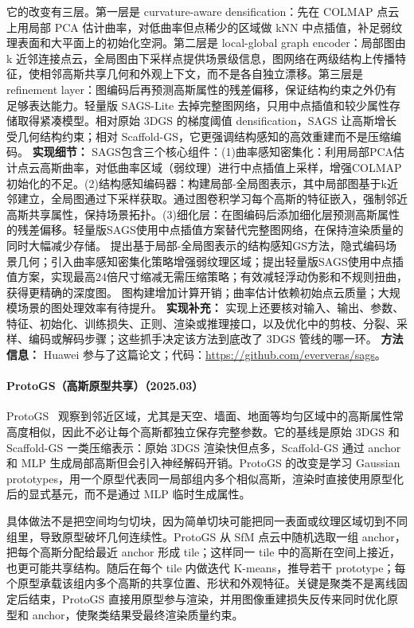 它的改变有三层。第一层是 curvature-aware densification：先在 COLMAP 点云上用局部 PCA 估计曲率，对低曲率但点稀少的区域做 kNN 中点插值，补足弱纹理表面和大平面上的初始化空洞。第二层是 local-global graph encoder：局部图由 k 近邻连接点云，全局图由下采样点提供场景级信息，图网络在两级结构上传播特征，使相邻高斯共享几何和外观上下文，而不是各自独立漂移。第三层是 refinement layer：图编码后再预测高斯属性的残差偏移，保证结构约束之外仍有足够表达能力。轻量版 SAGS-Lite 去掉完整图网络，只用中点插值和较少属性存储取得紧凑模型。相对原始 3DGS 的梯度阈值 densification，SAGS 让高斯增长受几何结构约束；相对 Scaffold-GS，它更强调结构感知的高效重建而不是压缩编码。
\textbf{实现细节：} SAGS包含三个核心组件：(1)曲率感知密集化：利用局部PCA估计点云高斯曲率，对低曲率区域（弱纹理）进行中点插值上采样，增强COLMAP初始化的不足。(2)结构感知编码器：构建局部-全局图表示，其中局部图基于k近邻建立，全局图通过下采样获取。通过图卷积学习每个高斯的特征嵌入，强制邻近高斯共享属性，保持场景拓扑。(3)细化层：在图编码后添加细化层预测高斯属性的残差偏移。轻量版SAGS使用中点插值方案替代完整图网络，在保持渲染质量的同时大幅减少存储。 提出基于局部-全局图表示的结构感知GS方法，隐式编码场景几何；引入曲率感知密集化策略增强弱纹理区域；提出轻量版SAGS使用中点插值方案，实现最高24倍尺寸缩减无需压缩策略；有效减轻浮动伪影和不规则扭曲，获得更精确的深度图。 图构建增加计算开销；曲率估计依赖初始点云质量；大规模场景的图处理效率有待提升。
\textbf{实现补充：} 实现上还要核对输入、输出、参数、特征、初始化、训练损失、正则、渲染或推理接口，以及优化中的剪枝、分裂、采样、编码或解码步骤；这些抓手决定该方法到底改了 3DGS 管线的哪一环。
\textbf{方法信息：} Huawei 参与了这篇论文；代码：\url{https://github.com/eververas/sags}。



\paragraph{ProtoGS（高斯原型共享）（2025.03）}
ProtoGS~\cite{2503_17486} 观察到邻近区域，尤其是天空、墙面、地面等均匀区域中的高斯属性常高度相似，因此不必让每个高斯都独立保存完整参数。它的基线是原始 3DGS 和 Scaffold-GS 一类压缩表示：原始 3DGS 渲染快但点多，Scaffold-GS 通过 anchor 和 MLP 生成局部高斯但会引入神经解码开销。ProtoGS 的改变是学习 Gaussian prototypes，用一个原型代表同一局部组内多个相似高斯，渲染时直接使用原型化后的显式基元，而不是通过 MLP 临时生成属性。

具体做法不是把空间均匀切块，因为简单切块可能把同一表面或纹理区域切到不同组里，导致原型破坏几何连续性。ProtoGS 从 SfM 点云中随机选取一组 anchor，把每个高斯分配给最近 anchor 形成 tile；这样同一 tile 中的高斯在空间上接近，也更可能共享结构。随后在每个 tile 内做迭代 K-means，推导若干 prototype；每个原型承载该组内多个高斯的共享位置、形状和外观特征。关键是聚类不是离线固定后结束，ProtoGS 直接用原型参与渲染，并用图像重建损失反传来同时优化原型和 anchor，使聚类结果受最终渲染质量约束。

